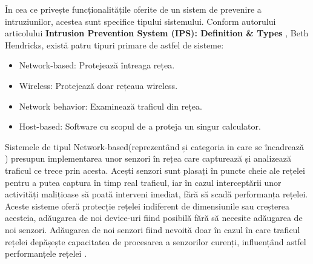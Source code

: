 În cea ce privește funcționalitățile oferite de un sistem de prevenire a intruziunilor, acestea sunt specifice tipului sistemului. Conform autorului articolului \textbf{Intrusion Prevention System (IPS): Definition \& Types} \cite{ips_types}, Beth Hendricks,  există patru tipuri primare de astfel de sisteme: 
\begin{itemize}
	\item Network-based: Protejează întreaga rețea.
	\item Wireless: Protejează doar rețeaua wireless.
	\item Network behavior: Examinează traficul din rețea.
	\item Host-based: Software cu scopul de a proteja un singur calculator.
\end{itemize}

Sistemele de tipul Network-based(reprezentând și categoria in care se încadrează  \textit{\thesistitle})  presupun implementarea unor senzori în rețea care capturează și analizează traficul ce trece prin acesta. Acești senzori sunt plasați în puncte cheie ale rețelei pentru a putea captura în timp real traficul, iar în cazul interceptării unor activități malițioase să poată interveni imediat, fără să scadă performanța rețelei. Aceste sisteme oferă protecție rețelei indiferent de dimensiunile sau creșterea acesteia, adăugarea de noi device-uri fiind posibilă fără să necesite adăugarea de noi senzori. Adăugarea de noi senzori fiind nevoită doar în cazul în care traficul rețelei depășește capacitatea de procesarea a senzorilor curenți, influențând astfel performanțele rețelei \cite{impl}.

